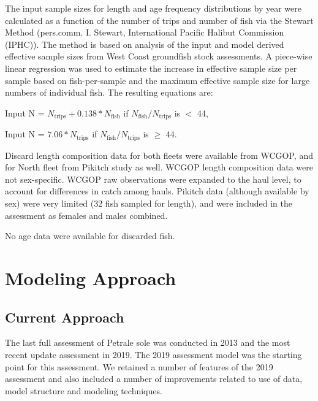 \documentclass[
]{scrartcl}
\begin{document}
The input sample sizes for length and age frequency distributions by
year were calculated as a function of the number of trips and number of
fish via the Stewart Method (pers.comm. I. Stewart, International
Pacific Halibut Commission (IPHC)). The method is based on analysis of
the input and model derived effective sample sizes from West Coast
groundfish stock assessments. A piece-wise linear regression was used to
estimate the increase in effective sample size per sample based on
fish-per-sample and the maximum effective sample size for large numbers
of individual fish. The resulting equations are:

\begin{centering}

Input N = $N_{\text{trips}} + 0.138 * N_{\text{fish}}$ if $N_{\text{fish}}/N_{\text{trips}}$ is $<$ 44,

Input N = $7.06 * N_{\text{trips}}$ if $N_{\text{fish}}/N_{\text{trips}}$ is $\geq$ 44.

\end{centering}

Discard length composition data for both fleets were available from
WCGOP, and for North fleet from Pikitch study as well. WCGOP length
composition data were not sex-specific. WCGOP raw observations were
expanded to the haul level, to account for differences in catch among
hauls. Pikitch data (although available by sex) were very limited (32
fish sampled for length), and were included in the assessment as females
and males combined.

No age data were available for discarded fish.

\newpage{}

\section{Modeling Approach}\label{sec-modeling-approach}

\subsection{Current Approach}\label{sec-current-approach}

The last full assessment of Petrale sole was conducted in 2013 and the
most recent update assessment in 2019. The 2019 assessment model was the
starting point for this assessment. We retained a number of features of
the 2019 assessment and also included a number of improvements related
to use of data, model structure and modeling techniques.
\end{document}
